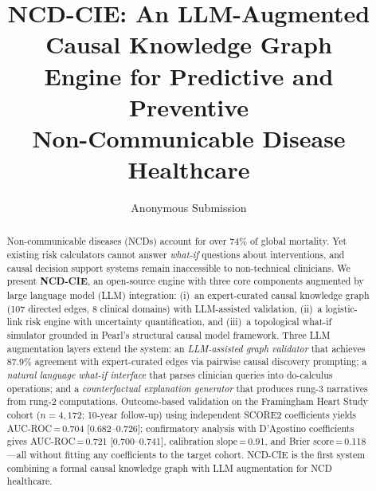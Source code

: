 \documentclass[runningheads]{llncs}
\begin{document}
\title{NCD-CIE: An LLM-Augmented Causal Knowledge Graph\\Engine for Predictive and Preventive\\Non-Communicable Disease Healthcare}

\author{Anonymous Submission}

\maketitle

\begin{abstract}
Non-communicable diseases (NCDs) account for over 74\% of global
mortality.
Yet existing risk calculators cannot answer \emph{what-if} questions
about interventions, and causal decision support systems remain
inaccessible to non-technical clinicians.
We present \textbf{NCD-CIE}, an open-source engine with three
core components augmented by large language model (LLM) integration:
(i)~an expert-curated causal knowledge graph (107 directed edges,
8 clinical domains) with LLM-assisted validation,
(ii)~a logistic-link risk engine with uncertainty quantification, and
(iii)~a topological what-if simulator grounded in Pearl's structural
causal model framework.
Three LLM augmentation layers extend the system:
an \emph{LLM-assisted graph validator} that achieves 87.9\% agreement
with expert-curated edges via pairwise causal discovery prompting;
a \emph{natural language what-if interface} that parses clinician
queries into do-calculus operations; and
a \emph{counterfactual explanation generator} that produces
rung-3 narratives from rung-2 computations.
Outcome-based validation on the Framingham Heart Study cohort
($n\!=\!4{,}172$; 10-year follow-up) using independent SCORE2
coefficients yields AUC-ROC\,=\,0.704 [0.682--0.726]; confirmatory
analysis with D'Agostino coefficients gives
AUC-ROC\,=\,0.721 [0.700--0.741],
calibration slope\,=\,0.91, and Brier score\,=\,0.118---all
without fitting any coefficients to the target cohort.
NCD-CIE is the first system combining a formal causal knowledge
graph with LLM augmentation for NCD healthcare.

\end{abstract}

\end{document}
